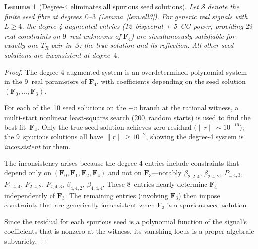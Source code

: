 \documentclass[11pt]{article}
\newtheorem{lemma}[theorem]{Lemma}
\newcommand{\norm}[1]{\lVert #1 \rVert}
\begin{document}
\begin{lemma}[Degree-4 eliminates all spurious seed solutions]
\label{lem:degree4-filter}
Let $\mathcal{S}$ denote the finite seed fibre at degrees~$0$--$3$
(Lemma~\ref{lem:ell3}).
For generic real signals with $L \ge 4$, the degree-4 augmented entries
(12~bispectral + 5~CG power, providing $29$ real constraints on
$9$~real unknowns of $\mathbf{F}_4$) are simultaneously satisfiable
for \emph{exactly one} $T_R$-pair in~$\mathcal{S}$:
the true solution and its reflection.
All other seed solutions are inconsistent at degree~$4$.
\end{lemma}
\begin{proof}
The degree-4 augmented system is an overdetermined polynomial system
in the 9~real parameters of $\mathbf{F}_4$, with coefficients depending
on the seed solution $(\mathbf{F}_0, \ldots, \mathbf{F}_3)$.

For each of the~10 seed solutions on the $+v$ branch at the rational
witness, a multi-start nonlinear least-squares search (200~random starts)
is used to find the best-fit~$\mathbf{F}_4$.
Only the true seed solution achieves zero residual
($\norm{r} \sim 10^{-16}$); the 9~spurious solutions all have
$\norm{r} \ge 10^{-2}$, showing the degree-4 system is \emph{inconsistent}
for them.

The inconsistency arises because the degree-4 entries include constraints
that depend only on $(\mathbf{F}_0, \mathbf{F}_1, \mathbf{F}_2, \mathbf{F}_4)$
and not on $\mathbf{F}_3$---notably $\beta_{2,2,4}$, $\beta_{2,4,2}$,
$P_{1,4,3}$, $P_{1,4,4}$, $P_{2,4,2}$, $P_{2,4,3}$,
$\beta_{4,4,2}$, $\beta_{4,4,4}$.
These 8~entries nearly determine $\mathbf{F}_4$ independently of $\mathbf{F}_3$.
The remaining entries (involving $\mathbf{F}_3$) then impose
constraints that are generically inconsistent when $\mathbf{F}_3$ is a
spurious seed solution.

Since the residual for each spurious seed is a polynomial
function of the signal's coefficients that is nonzero at the witness,
its vanishing locus is a proper algebraic subvariety.
\end{proof}
\end{document}
